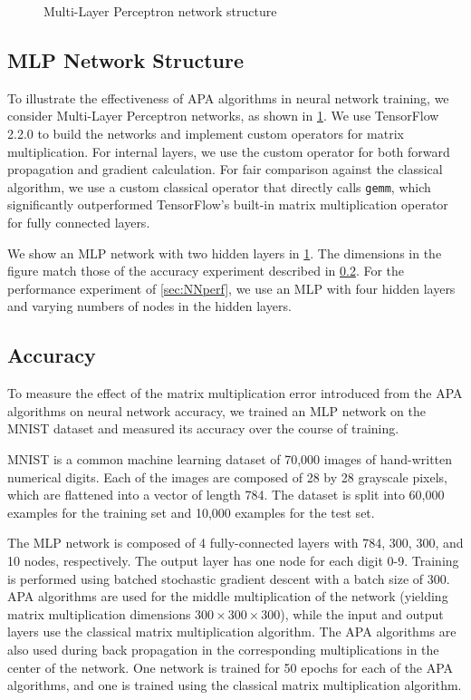 \documentclass[sigconf,review,anonymous]{acmart}
\begin{document}
\begin{figure}[hb!]
\centering

\caption{Multi-Layer Perceptron network structure}
\label{fig:neuralnet}
\end{figure}



\subsection{MLP Network Structure}

To illustrate the effectiveness of APA algorithms in neural network training, we consider Multi-Layer Perceptron networks, as shown in \cref{fig:neuralnet}.
We use TensorFlow 2.2.0 to build the networks and implement custom operators for matrix multiplication.
For internal layers, we use the custom operator for both forward propagation and gradient calculation.
For fair comparison against the classical algorithm, we use a custom classical operator that directly calls \texttt{gemm}, which significantly outperformed TensorFlow's built-in matrix multiplication operator for fully connected layers.

We show an MLP network with two hidden layers in \cref{fig:neuralnet}.
The dimensions in the figure match those of the accuracy experiment described in \cref{sec:NNacc}.
For the performance experiment of \cref{sec:NNperf}, we use an MLP with four hidden layers and varying numbers of nodes in the hidden layers.

\subsection{Accuracy}
\label{sec:NNacc}

To measure the effect of the matrix multiplication error introduced from the APA algorithms on neural network accuracy, we trained an MLP network on the MNIST dataset \cite{LBBH98} and measured its accuracy over the course of training. 

MNIST is a common machine learning dataset of 70,000 images of hand-written numerical digits. 
Each of the images are composed of 28 by 28 grayscale pixels, which are flattened into a vector of length 784.
The dataset is split into 60,000 examples for the training set and 10,000 examples for the test set. 

The MLP network is composed of 4 fully-connected layers with 784, 300, 300, and 10 nodes, respectively.  
The output layer has one node for each digit 0-9. 
Training is performed using batched stochastic gradient descent with a batch size of 300.
APA algorithms are used for the middle multiplication of the network (yielding matrix multiplication dimensions $300\times 300\times300$), while the input and output layers use the classical matrix multiplication algorithm. 
The APA algorithms are also used during back propagation in the corresponding multiplications in the center of the network.
One network is trained for 50 epochs for each of the APA algorithms, and one is trained using the classical matrix multiplication algorithm.
\end{document}
